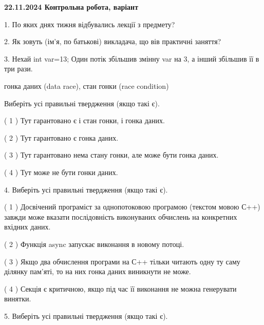 \documentclass[12pt, ukrainian]{article}
\begin{document}
\vspace{4mm}
\newpage
\begin {large}

\textbf{22.11.2024 Контрольна робота, варіант  }\par


{
1. По яких днях тижня відбувались лекції з предмету?



\vspace{5mm}
2. Як зовуть (ім'я, по батькові) викладача, що вів практичні заняття?



\vspace{5mm}
3. Нехай int var=13; Один потік збільшив змінну var на 3, а інший збільшив її в три рази.

гонка даних (data race), стан гонки (race condition)

Виберіть усі правильні твердження (якщо такі є).\par
\vspace{2mm}
( 1 ) Тут гарантовано є і стан гонки, і гонка даних.%

( 2 ) Тут гарантовано є гонка даних.%

( 3 ) Тут гарантовано нема стану гонки, але може бути гонка даних.%

( 4 ) Тут може не бути гонки даних.%


\vspace{5mm}
4. Виберіть усі правильні твердження (якщо такі є).\par
\vspace{2mm}

( 1 ) Досвічений програміст за однопотоковою програмою (текстом мовою С++) завжди може вказати послідовність виконуваних обчислень на конкретних вхідних даних.%

( 2 ) Функція async запускає виконання в новому потоці.%

( 3 ) Якщо два обчислення програми на С++ тільки читають одну ту саму ділянку пам'яті, то на них гонка даних  виникнути не може.%

( 4 ) Секція є критичною, якщо під час її виконання не можна генерувати винятки.%


\vspace{5mm}
5. Виберіть усі правильні твердження (якщо такі є).\par
\vspace{2mm}

}
\end{large}
\end{document}
